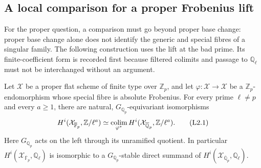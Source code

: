 \subsection{A local comparison for a proper Frobenius lift}

For the proper question, a comparison must go beyond proper base
change: proper base change alone does not identify the generic and
special fibres of a singular family.  The following construction uses
the lift at the bad prime.  Its finite-coefficient form is recorded
first because filtered colimits and passage to $\mathbb Q_\ell$ must
not be interchanged without an argument.

\begin{theorem}
\label{NX-L02}
Let $\mathcal X$ be a proper flat scheme of finite type over
$\mathbb Z_p$, and let $\varphi:\mathcal X\to\mathcal X$ be a
$\mathbb Z_p$-endomorphism whose special fibre is absolute Frobenius.
For every prime $\ell\ne p$ and every $a\geq1$, there are natural,
$G_{\mathbb Q_p}$-equivariant isomorphisms
\[
 H^i(\mathcal X_{\overline{\mathbb F}_p},\mathbb Z/\ell^a)
 \simeq
 \mathop{\rm colim}_{\varphi^*}
 H^i(\mathcal X_{\overline{\mathbb Q}_p},\mathbb Z/\ell^a).
 \tag{L2.1}
\]
Here $G_{\mathbb Q_p}$ acts on the left through its unramified
quotient.  In particular
$H^i(\mathcal X_{\overline{\mathbb F}_p},\mathbb Q_\ell)$ is
isomorphic to a $G_{\mathbb Q_p}$-stable direct summand of
$H^i(\mathcal X_{\overline{\mathbb Q}_p},\mathbb Q_\ell)$.
\end{theorem}

